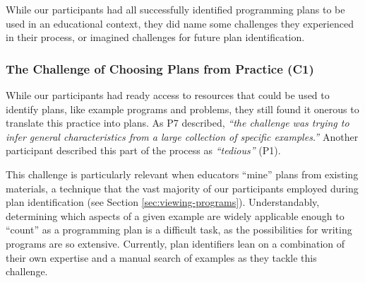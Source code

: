 While our participants had all successfully identified programming plans to be used in an educational context, they did name some challenges they experienced in their process, or imagined challenges for future plan identification. %


\subsubsection{The Challenge of Choosing Plans from Practice (C1)} 
\label{sec:challenges_practice}
While our participants had ready access to resources that could be used to identify plans, like example programs and problems, they still found it onerous to translate this practice into plans. As P7 described, \textit{``the challenge was trying to infer general characteristics from a large collection of specific examples.''} Another participant described this part of the process as \textit{``tedious''} (P1). 

This challenge is particularly relevant when educators ``mine'' plans from existing materials, a technique that the vast majority of our participants employed during plan identification (see Section \ref{sec:viewing-programs}). Understandably, determining which aspects of a given example are widely applicable enough to ``count'' as a programming plan is a difficult task, as the possibilities for writing programs are so extensive. Currently, plan identifiers lean on a combination of their own expertise and a manual search of examples as they tackle this challenge.

